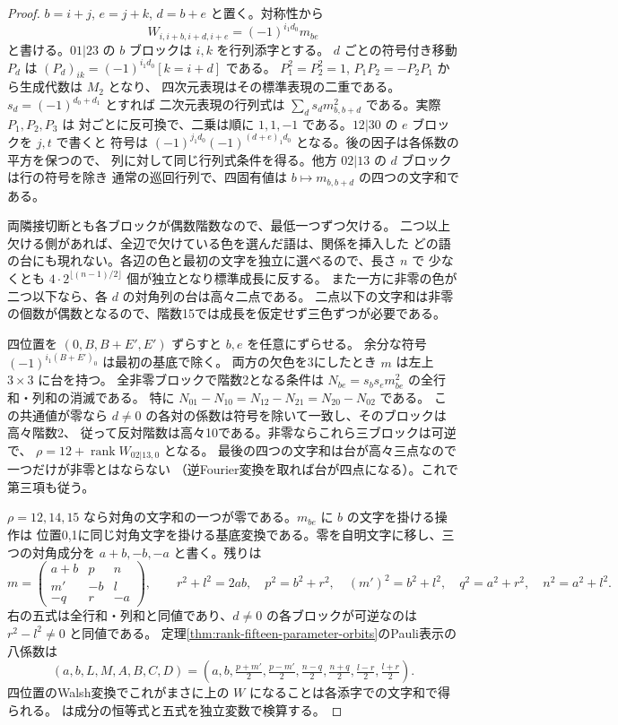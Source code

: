 \begin{proof}
$b=i+j$, $e=j+k$, $d=b+e$ と置く。対称性から
\[
 W_{i,i+b,i+d,i+e}=(-1)^{i_1d_0}m_{be}
\]
と書ける。$01|23$ の $b$ ブロックは $i,k$ を行列添字とする。
$d$ ごとの符号付き移動 $P_d$ は $(P_d)_{ik}=(-1)^{i_1d_0}[k=i+d]$ である。
$P_1^2=P_2^2=1$, $P_1P_2=-P_2P_1$ から生成代数は $M_2$ となり、
四次元表現はその標準表現の二重である。$s_d=(-1)^{d_0+d_1}$ とすれば
二次元表現の行列式は $\sum_ds_d m_{b,b+d}^2$ である。実際 $P_1,P_2,P_3$ は
対ごとに反可換で、二乗は順に $1,1,-1$ である。$12|30$ の $e$ ブロックを $j,t$ で書くと
符号は $(-1)^{j_1 d_0}(-1)^{(d+e)_1d_0}$ となる。後の因子は各係数の平方を保つので、
列に対して同じ行列式条件を得る。他方 $02|13$ の $d$ ブロックは行の符号を除き
通常の巡回行列で、四固有値は $b\mapsto m_{b,b+d}$ の四つの文字和である。

両隣接切断とも各ブロックが偶数階数なので、最低一つずつ欠ける。
二つ以上欠ける側があれば、全辺で欠けている色を選んだ語は、関係を挿入した
どの語の台にも現れない。各辺の色と最初の文字を独立に選べるので、長さ $n$ で
少なくとも $4\cdot2^{\lfloor(n-1)/2\rfloor}$ 個が独立となり標準成長に反する。
また一方に非零の色が二つ以下なら、各 $d$ の対角列の台は高々二点である。
二点以下の文字和は非零の個数が偶数となるので、階数15では成長を仮定せず三色ずつが必要である。

四位置を $(0,B,B+E',E')$ ずらすと $b,e$ を任意にずらせる。
余分な符号 $(-1)^{i_1(B+E')_0}$ は最初の基底で除く。
両方の欠色を3にしたとき $m$ は左上 $3\times3$ に台を持つ。
全非零ブロックで階数2となる条件は $N_{be}=s_bs_em_{be}^2$ の全行和・列和の消滅である。
特に $N_{01}-N_{10}=N_{12}-N_{21}=N_{20}-N_{02}$ である。
この共通値が零なら $d\ne0$ の各対の係数は符号を除いて一致し、そのブロックは高々階数2、
従って反対階数は高々10である。非零ならこれら三ブロックは可逆で、
$\rho=12+\operatorname{rank} W_{02|13,0}$ となる。
最後の四つの文字和は台が高々三点なので一つだけが非零とはならない
（逆Fourier変換を取れば台が四点になる）。これで第三項も従う。

$\rho=12,14,15$ なら対角の文字和の一つが零である。$m_{be}$ に $b$ の文字を掛ける操作は
位置0,1に同じ対角文字を掛ける基底変換である。零を自明文字に移し、三つの対角成分を
$a+b,-b,-a$ と書く。残りは
\[
 m=\begin{pmatrix}a+b&p&n\\ m'&-b&l\\ -q&r&-a\end{pmatrix},\qquad
 r^2+l^2=2ab,\quad p^2=b^2+r^2,\quad (m')^2=b^2+l^2,\quad
 q^2=a^2+r^2,\quad n^2=a^2+l^2 .
\]
右の五式は全行和・列和と同値であり、$d\ne0$ の各ブロックが可逆なのは $r^2-l^2\ne0$ と同値である。
定理\ref{thm:rank-fifteen-parameter-orbits}のPauli表示の八係数は
\[
 (a,b,L,M,A,B,C,D)=
 \left(a,b,\tfrac{p+m'}2,\tfrac{p-m'}2,\tfrac{n-q}2,\tfrac{n+q}2,
                 \tfrac{l-r}2,\tfrac{l+r}2\right).
\]
四位置のWalsh変換でこれがまさに上の $W$ になることは各添字での文字和で得られる。
 は成分の恒等式と五式を独立変数で検算する。


\end{proof}
